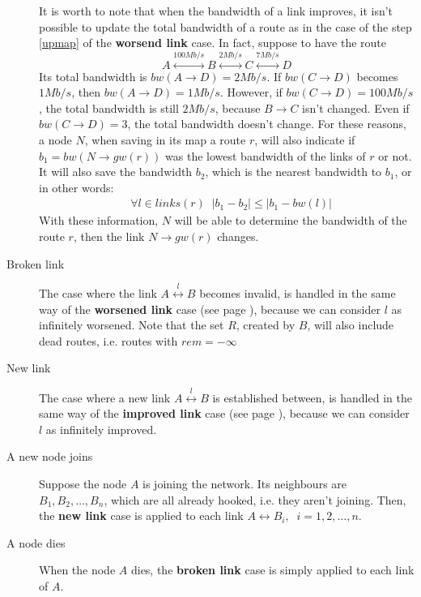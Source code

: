 \documentclass[a4paper]{article}
\newcommand{\pass}[1]{\Big|#1\Big|}
\newcommand{\eal}[1]{{\begin{align*} #1 \end{align*}}}
\def\8{{\infty}}
\begin{document}
\begin{description}
		It is worth to note that when the bandwidth of a link
		improves, it isn't possible to update the total bandwidth of a route
		as in the case of the step \ref{upmap} of the
		\textbf{worsend link} case. In fact, suppose to have the route
		\[
		A \stackrel{100 Mb/s}{\leftrightarrow} B \stackrel{2
		Mb/s}{\leftrightarrow} C \stackrel{7 Mb/s}{\leftrightarrow}
		D
\]
Its total bandwidth is $bw(A\rightarrow D)=2 Mb/s$. If $bw(C\rightarrow D)$
becomes $1 Mb/s$, then $bw(A\rightarrow D)=1 Mb/s$. However, if
$bw(C\rightarrow D)=100 Mb/s$, the total bandwidth is still $2 Mb/s$, because
$B\rightarrow C$ isn't changed. Even if $bw(C\rightarrow D)=3$, the total
bandwidth
doesn't change. For these reasons, a node $N$, when saving in its map a route
$r$, will also indicate if $b_1=bw(N\rightarrow gw(r))$ was the lowest
bandwidth of the links of $r$ or not. It will also save the bandwidth $b_2$, which is the
nearest bandwidth to $b_1$, or in other words:
\eal{&\forall l\in links(r)\;\;\pass{b_1-b_2}\le \pass{b_1-bw(l)}}
With these information, $N$ will be able to determine the bandwidth of the route $r$,
then the link $N\rightarrow gw(r)$ changes.
	\item[Broken link] 
		The case where the link $A \stackrel{l}{\leftrightarrow} B$ becomes invalid, is handled
		in the same way of the \textbf{worsened link} case (see
		page \pageref{wlink}), because we can consider $l$ as
		infinitely worsened. 
		Note that the set $R$, created by $B$, will also include dead
		routes, i.e. routes with $rem=-\8$
	\item[New link]
		The case where a new link $A \stackrel{l}{\leftrightarrow} B$
		is established between, is handled  in the same way of the
		\textbf{improved link} case (see page \pageref{ilink}),
		because we can consider $l$ as infinitely improved.
	\item[A new node joins]
		Suppose the node $A$ is joining the network. Its neighbours
		are $B_1, B_2,\dots, B_n$, which are all already hooked, i.e.
		they aren't joining. Then, the \textbf{new link} case is
		applied to each link $A\leftrightarrow B_i,\;\;i=1,2,\dots,n$.
	\item[A node dies]
		When the node $A$ dies, the \textbf{broken link} case is
		simply applied to each link of $A$.
\end{description}
\end{document}
